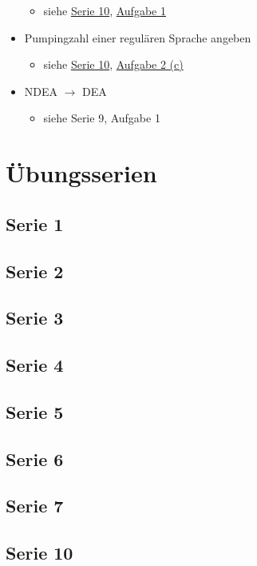 \documentclass[
  a4paper,
  11pt,
]{scrartcl}
\begin{document}
\begin{itemize}
\begin{itemize}
      \item siehe \hyperref[sub:serie_10]{Serie 10},
        \hyperref[kfs_serie_10_aufgabe_1]{Aufgabe 1}
    \end{itemize}
  \item Pumpingzahl einer regulären Sprache angeben
    \begin{itemize}
      \item siehe \hyperref[sub:serie_10]{Serie 10},
        \hyperref[kfs_serie_10_aufgabe_2_c]{Aufgabe 2 (c)}
    \end{itemize}
  \item NDEA $\rightarrow$ DEA
    \begin{itemize}
      \item siehe Serie 9, Aufgabe 1
    \end{itemize}
\end{itemize}

\section{Übungsserien}


\subsection{Serie 1}
\label{sub:serie_1}




\subsection{Serie 2}
\label{sub:serie_2}




\subsection{Serie 3}
\label{sub:serie_3}




\subsection{Serie 4}
\label{sub:serie_4}




\subsection{Serie 5}
\label{sub:serie_5}




\subsection{Serie 6}
\label{sub:serie_6}




\subsection{Serie 7}
\label{sub:serie_7}



\subsection{Serie 10}
\label{sub:serie_10}


\end{document}
